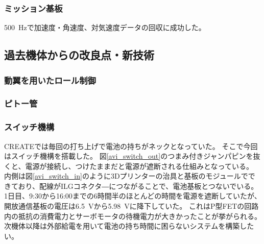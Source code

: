 \documentclass[a4paper,11pt,titlepage,uplatex]{jsarticle}
\begin{document}
\subsubsection{ミッション基板}
\SI{500}{Hz}で加速度・角速度、対気速度データの回収に成功した。

\subsection{過去機体からの改良点・新技術}
\subsubsection{動翼を用いたロール制御}

\subsubsection{ピトー管}

\subsubsection{スイッチ機構}
\label{switch}
CREATEでは毎回の打ち上げで電池の持ちがネックとなっていた。
そこで今回はスイッチ機構を搭載した。
図\ref{avi_switch_out}のつまみ付きジャンパピンを抜くと、電源が接続し、つけたままだと電源が遮断される仕組みとなっている。
内側は図\ref{avi_switch_in}のように3Dプリンターの治具と基板のモジュールでできており、配線がILGコネクタ―につながることで、電池基板とつないでいる。
1日目、9:30から16:00までの6時間半のほとんどの時間を電源を遮断していたが、開放通信基板の電圧は\SI{6.5}{V}から\SI{5.98}{V}に降下していた。
これはP型FETの回路内の抵抗の消費電力とサーボモータの待機電力が大きかったことが挙がられる。
次機体以降は外部給電を用いて電池の持ち時間に困らないシステムを構築したい。
\end{document}
